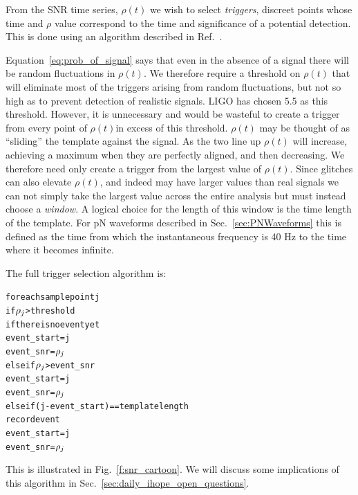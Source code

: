 From the SNR time series, $\rho(t)$ we wish to select \emph{triggers},
discreet points whose time and $\rho$ value correspond to the time and
significance of a potential detection.  This is done using an
algorithm described in Ref.~\cite{Allen:2005fk}.

Equation~\ref{eq:prob_of_signal} says that even in the absence of a
signal there will be random fluctuations in $\rho(t)$.  We therefore
require a threshold on $\rho(t)$ that will eliminate most of the
triggers arising from random fluctuations, but not so high as to
prevent detection of realistic signals.  LIGO has chosen 5.5 as this
threshold.  However, it is unnecessary and would be wasteful to create
a trigger from every point of $\rho(t)$in excess of this threshold.
$\rho(t)$ may be thought of as ``sliding'' the template against the
signal.  As the two line up $\rho(t)$ will increase, achieving a
maximum when they are perfectly aligned, and then decreasing.  We
therefore need only create a trigger from the largest value of
$\rho(t)$.  Since glitches can also elevate $\rho(t)$, and indeed
may have larger values than real signals we can not simply take the
largest value across the entire analysis but must instead choose a
\emph{window}.  A logical choice for the length of this window is the
time length of the template.  For pN waveforms described in
Sec.~\ref{sec:PNWaveforms} this is defined as the time from which
the instantaneous frequency is 40 Hz to the time where it becomes
infinite.

The full trigger selection algorithm is:
\newpage

\begin{alltt}
for each sample point j
  if \(\rho\sb{j}\) > threshold
    if there is no event yet
      event\_start = j
      event\_snr   = \(\rho\sb{j}\)
    else if \(\rho\sb{j}\) > event\_snr
      event\_start = j
      event\_snr = \(\rho\sb{j}\)
    else if (j - event\_start) == template length
      record event
      event\_start = j
      event\_snr   = \(\rho\sb{j}\)
\end{alltt}
%
This is illustrated in Fig.~\ref{f:snr_cartoon}.  We will discuss
some implications of this algorithm in
Sec.~\ref{sec:daily_ihope_open_questions}.


